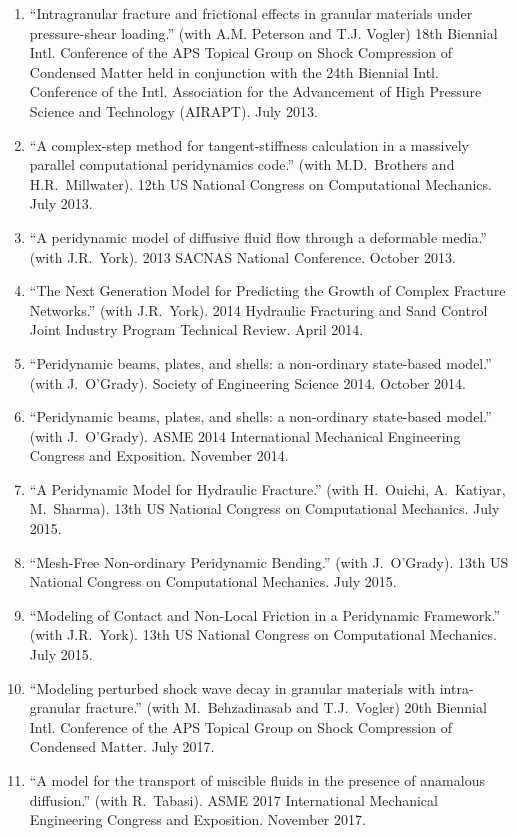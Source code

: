 \ifdefined\iscockrell
\begin{enumerate}
  \item ``Intragranular fracture and frictional effects in granular materials under pressure-shear loading.'' (with A.M. Peterson and T.J. Vogler) 18th Biennial Intl. Conference of the APS Topical Group on Shock Compression of Condensed Matter held in conjunction with the 24th Biennial Intl. Conference of the Intl. Association for the Advancement of High Pressure Science and Technology (AIRAPT). July 2013.
  \item ``A complex-step method for tangent-stiffness calculation in a massively parallel computational peridynamics code.'' (with M.D.~Brothers and H.R.~Millwater). 12th US National Congress on Computational Mechanics. July 2013.
  \item ``A peridynamic model of diffusive fluid flow through a deformable media.'' (with J.R.~York). 2013 SACNAS National Conference. October 2013.
  \item ``The Next Generation Model for Predicting the Growth of Complex Fracture Networks.'' (with J.R.~York). 2014 Hydraulic Fracturing and Sand Control Joint Industry Program Technical Review.  April 2014.
  \item ``Peridynamic beams, plates, and shells: a non-ordinary state-based model.'' (with J.~O'Grady). Society of Engineering Science 2014. October 2014.
  \item ``Peridynamic beams, plates, and shells: a non-ordinary state-based model.'' (with J.~O'Grady). ASME 2014 International Mechanical Engineering Congress and Exposition. November 2014.
  \item ``A Peridynamic Model for Hydraulic Fracture.'' (with H.~Ouichi, A.~Katiyar, M.~Sharma). 13th US National Congress on Computational Mechanics. July 2015.
  \item ``Mesh-Free Non-ordinary Peridynamic Bending.'' (with J.~O'Grady). 13th US National Congress on Computational Mechanics. July 2015.
  \item ``Modeling of Contact and Non-Local Friction in a Peridynamic Framework.'' (with J.R.~York). 13th US National Congress on Computational Mechanics. July 2015.
  \item ``Modeling perturbed shock wave decay in granular materials with intra-granular fracture.'' (with M.\ Behzadinasab and T.J.\ Vogler) 20th Biennial Intl. Conference of the APS Topical Group on Shock Compression of Condensed Matter. July 2017.
  \item ``A model for the transport of miscible fluids in the presence of anamalous diffusion.'' (with R.\ Tabasi).  ASME 2017 International Mechanical Engineering Congress and Exposition. November 2017.

\end{enumerate}
